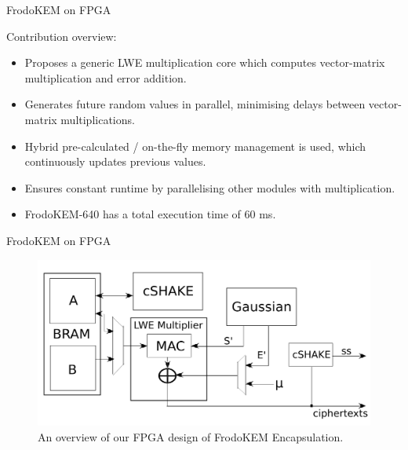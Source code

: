 \documentclass{beamer}            %
\begin{document}
\begin{frame}{FrodoKEM on FPGA}

Contribution overview:


\begin{itemize}
\item Proposes a generic LWE multiplication core which computes vector-matrix multiplication and error addition.
\item Generates future random values in parallel, minimising delays between vector-matrix multiplications.
\item Hybrid pre-calculated / on-the-fly memory management is used, which continuously updates previous values.
\item Ensures constant runtime by parallelising other modules with multiplication.
\item \textsf{FrodoKEM-640} has a total execution time of 60 ms.


\end{itemize}
\end{frame}


\begin{frame}{FrodoKEM on FPGA}

\begin{figure}
\includegraphics[scale=0.5]{FPGA_encaps}
\caption{An overview of our FPGA design of \textsf{FrodoKEM} Encapsulation.}
\end{figure}

\end{frame}
\end{document}
